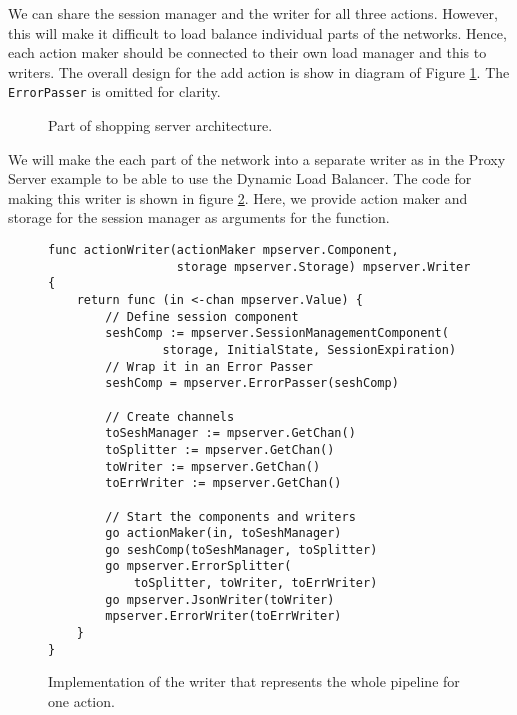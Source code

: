 We can share the session manager and the writer for all three actions. 
However, this will make it difficult to load balance individual parts
of the networks. Hence, each action maker should be connected to their
own load manager and this to writers. The overall design for the add action
is show in diagram of Figure \ref{fig:shoppingDesign}. The \texttt{ErrorPasser} 
is omitted for clarity.
\begin{figure}[h]
\centering
{}
\caption[scale=1.0]{Part of shopping server architecture.}
\label{fig:shoppingDesign}
\end{figure}

We will make the each part of the network into a separate writer as in
the Proxy Server example to be able to use the Dynamic Load Balancer.
The code for making this writer is shown in figure \ref{fig:shoppingWriter}.
Here, we provide action maker and storage for the session manager 
as arguments for the function.
\newpage
\begin{figure}[h]
\begin{lstlisting}
func actionWriter(actionMaker mpserver.Component, 
                  storage mpserver.Storage) mpserver.Writer {
    return func (in <-chan mpserver.Value) {
        // Define session component
        seshComp := mpserver.SessionManagementComponent(
                storage, InitialState, SessionExpiration)
        // Wrap it in an Error Passer
        seshComp = mpserver.ErrorPasser(seshComp)

        // Create channels
        toSeshManager := mpserver.GetChan()
        toSplitter := mpserver.GetChan()
        toWriter := mpserver.GetChan()
        toErrWriter := mpserver.GetChan()

        // Start the components and writers
        go actionMaker(in, toSeshManager)
        go seshComp(toSeshManager, toSplitter)
        go mpserver.ErrorSplitter(
            toSplitter, toWriter, toErrWriter)
        go mpserver.JsonWriter(toWriter)
        mpserver.ErrorWriter(toErrWriter)
    }
}
\end{lstlisting}
\caption[scale=1.0]{Implementation of the writer that represents the whole
pipeline for one action.}
\label{fig:shoppingWriter}
\end{figure}

